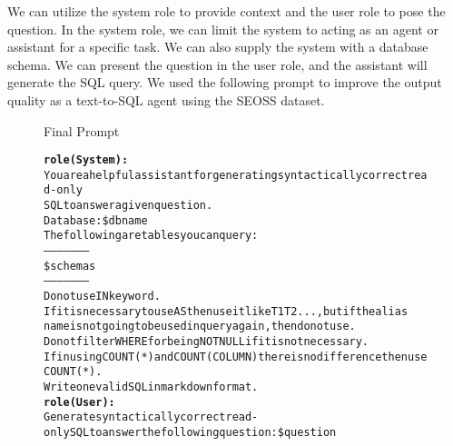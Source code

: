 We can utilize the system role to provide context and the user role to pose the question. In the system role, we can limit the system to acting as an agent or assistant for a specific task. We can also supply the system with a database schema. We can present the question in the user role, and the assistant will generate the SQL query. We used the following prompt to improve the output quality as a text-to-SQL agent using the SEOSS dataset.

\begin{figure}[H]
    \begin{AIbox}{Final Prompt}
        \vspace{-5px}
        \parbox{1\textwidth}{\scriptsize
        \begin{alltt} 
            {\bf role(System):} \\ 
            You are a helpful assistant for generating syntactically correct read-only                   \\
            SQL to answer a given question.                                                              \\
            Database: \$dbname                                                                           \\
            The following are tables you can query:                                                      \\
            ---------------------                                                                        \\
            \$schemas                                                                                    \\
            ---------------------                                                                        \\
            Do not use IN keyword.                                                                       \\
            If it is necessary to use AS then use it like T1 T2 ..., but if the alias                    \\
            name is not going to be used in query again, then do not use.                                \\
            Do not filter WHERE for being NOT NULL if it is not necessary.                               \\
            If in using  COUNT(*) and COUNT(COLUMN) there is no difference then use COUNT(*). \\
            Write one valid SQL in markdown format.
            \\
            {\bf role(User):} \\
            Generate syntactically correct read-only SQL to answer the following question: \$question
        \end{alltt}
        }
        \vspace{-5px}
    \end{AIbox}
\end{figure}

